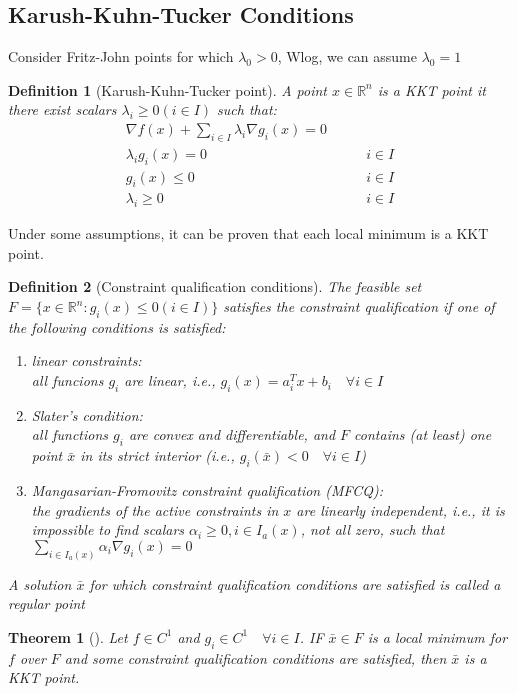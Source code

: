 \documentclass{book}
\newcommand{\R}{\mathbb{R}}
\theoremstyle{theoremv2}
\newtheorem{theorem}{Theorem}[chapter]
\theoremstyle{defv2}
\newtheorem{definition}{Definition}[chapter]
\theoremstyle{remark}
\theoremstyle{remark}
\begin{document}
\subsection{Karush-Kuhn-Tucker Conditions}
Consider Fritz-John points for which $\lambda_0>0$, Wlog, we can assume $\lambda_0=1$ 
\begin{definition}[Karush-Kuhn-Tucker point]
    A point $x\in\R^n$ is a KKT point it there exist scalars $\lambda_i\geq 0 (i\in I)$ such that:
    \begin{align}
        \nabla f(x) + \displaystyle\sum_{i\in I} \lambda_i \nabla g_i(x)=0&\\
        \lambda_i g_i(x)=0& \qquad i\in I\\
        g_i(x)\leq 0 & \qquad i \in I\\
        \lambda_i \geq 0 & \qquad i\in I
    \end{align}
\end{definition}
Under some assumptions, it can be proven that each local minimum is a KKT point. 
\begin{definition}[Constraint qualification conditions]
    The feasible set $F=\{ x\in \R^n:g_i(x)\leq 0 (i\in I) \}$ satisfies the constraint qualification if one of the following conditions is satisfied:
    \begin{enumerate}
        \item linear constraints: \\
            all funcions $g_i$ are linear, i.e., $g_i(x)=a^T_ix+b_i \quad \forall i\in I$
        \item Slater's condition: \\
            all functions $g_i$ are convex and differentiable, and $F$ contains (at least) one point $\bar{x}$ in its strict interior (i.e., $g_i(\bar{x})<0 \quad \forall i \in I$)
        \item Mangasarian-Fromovitz constraint qualification (MFCQ):\\
            the gradients of the active constraints in $x$ are linearly independent, i.e., it is impossible to find scalars $\alpha_i\geq 0, i\in I_a(x)$, not all zero, such that $\sum_{i\in I_a(x)}\alpha_i\nabla g_i(x)=0$
    \end{enumerate}
    A solution $\bar{x}$ for which constraint qualification conditions are satisfied is called a \emph{regular point}
\end{definition}
\begin{theorem}[]
    Let $f\in C^1$ and $g_i\in C^1 \quad \forall i \in I$. IF $\bar{x}\in F$ is a local minimum for $f$ over $F$ and some constraint qualification conditions are satisfied, then $\bar{x}$ is a KKT point.
\end{theorem}
\end{document}
